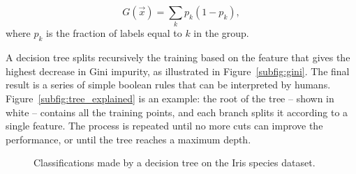 \[ G(\vec x) = \sum_k p_{k} (1-p_k),\]
where $p_k$ is the fraction of labels equal to $k$ in the group.

A decision tree splits recursively the training based on the feature that gives the highest decrease in Gini impurity, as illustrated in Figure~\ref{subfig:gini}.
The final result is a series of simple boolean rules that can be interpreted by humans.
Figure~\ref{subfig:tree_explained} is an example: the root of the tree -- shown in white -- contains all the training points, and each branch splits it according to a single feature.
The process is repeated until no more cuts can improve the performance, or until the tree reaches a maximum depth.

\begin{figure}[tb]
	\hfill
	\caption{Classifications made by a decision tree on the Iris species dataset.}\label{fig:tree}
\end{figure}

